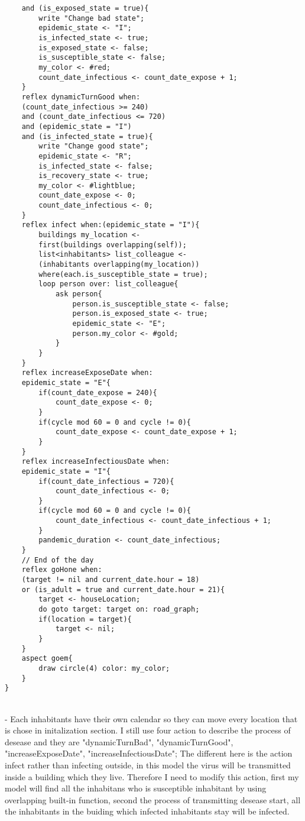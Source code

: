 \documentclass{article}
\begin{document}
\begin{lstlisting}
	and (is_exposed_state = true){
		write "Change bad state";
		epidemic_state <- "I";
		is_infected_state <- true;
		is_exposed_state <- false;
		is_susceptible_state <- false;	
		my_color <- #red;
		count_date_infectious <- count_date_expose + 1;
	}
	reflex dynamicTurnGood when: 
	(count_date_infectious >= 240) 
	and (count_date_infectious <= 720) 
	and (epidemic_state = "I") 
	and (is_infected_state = true){
		write "Change good state";
		epidemic_state <- "R";
		is_infected_state <- false;
		is_recovery_state <- true;
		my_color <- #lightblue;
		count_date_expose <- 0;
		count_date_infectious <- 0;
	}
	reflex infect when:(epidemic_state = "I"){
		buildings my_location <- 
		first(buildings overlapping(self));
		list<inhabitants> list_colleague <- 
		(inhabitants overlapping(my_location)) 
		where(each.is_susceptible_state = true);
		loop person over: list_colleague{
			ask person{
				person.is_susceptible_state <- false;
				person.is_exposed_state <- true;
				epidemic_state <- "E";
				person.my_color <- #gold;
			}
		}
	}
	reflex increaseExposeDate when: 
	epidemic_state = "E"{
		if(count_date_expose = 240){
			count_date_expose <- 0;
		}
		if(cycle mod 60 = 0 and cycle != 0){
			count_date_expose <- count_date_expose + 1;
		}
	}
	reflex increaseInfectiousDate when: 
	epidemic_state = "I"{
		if(count_date_infectious = 720){
			count_date_infectious <- 0;
		}
		if(cycle mod 60 = 0 and cycle != 0){
			count_date_infectious <- count_date_infectious + 1;
		}
		pandemic_duration <- count_date_infectious;
	}
	// End of the day
	reflex goHone when: 
	(target != nil and current_date.hour = 18) 
	or (is_adult = true and current_date.hour = 21){
		target <- houseLocation;
		do goto target: target on: road_graph;
		if(location = target){
			target <- nil;
		}
	}
	aspect goem{
		draw circle(4) color: my_color;
	}
}
\end{lstlisting}
\\- Each inhabitants have their own calendar so they can move every location that is chose in initalization section. I still use four action to describe the process of desease and they are "dynamicTurnBad", "dynamicTurnGood", "increaseExposeDate", "increaseInfectiousDate"; The different here is the action infect rather than infecting outside, in this model the virus will be transmitted inside a building which they live. Therefore I need to modify this action, first my model will find all the inhabitans who is susceptible inhabitant by using overlapping built-in function, second the process of transmitting desease start, all the inhabitants in the buiding which infected inhabitants stay will be infected.
\end{document}
